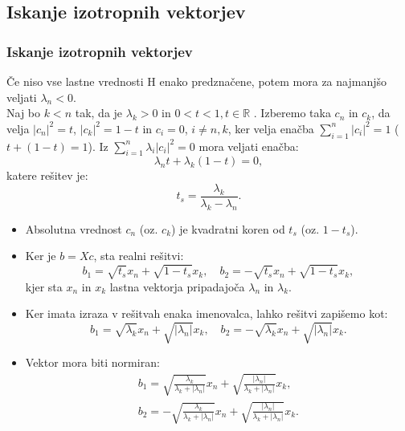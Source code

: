 \documentclass{beamer}
\newcommand{\abs}[1]{ \left\lvert#1\right\rvert}
\newcommand{\R}{\mathbb R}
\begin{document}
\subsection{Iskanje izotropnih vektorjev}
\begin{frame}
\frametitle{Iskanje izotropnih vektorjev}
\begin{block}{}
Če niso vse lastne vrednosti H enako predznačene, potem mora za najmanjšo veljati $\lambda_n <0$. \medskip \\
 Naj bo $k<n$ tak, da je $\lambda_k >0$ in $0<t<1, t\in \R$ . Izberemo \medskip taka $c_n$ in $c_k$, da velja  $\abs{c_n}^2 =t$, $\abs{c_k}^2=1-t$ in $c_i =0$, $i\not=n,k$, \medskip  ker velja enačba $\sum_{i=1}^{n}\abs{c_i}^2=1$ ($t+ (1-t)=1$). Iz \medskip $\sum_{i=1}^{n} \lambda_i \abs{c_i}^2=0$ mora veljati enačba: $$\lambda_n t +\lambda_k (1-t)=0,$$ katere rešitev je:
\begin{equation*}
t_s=\frac{\lambda_k}{\lambda_k -\lambda_n}.
\end{equation*}
\end{block}
\end{frame}
\begin{frame}
\begin{itemize}
\item Absolutna vrednost $c_n$ (oz. $c_k$) je kvadratni koren od $t_s$ (oz. $1-t_s$).
\item Ker je $b=Xc$, sta realni rešitvi: $$b_1=\sqrt{t_s}x_n +\sqrt{1-t_s}x_k,\quad b_2=-\sqrt{t_s}x_n+\sqrt{1-t_s}x_k,$$ kjer sta $x_n$ in $x_k$ lastna vektorja pripadajoča  $\lambda_n$ in $\lambda_k$.\pause
\item Ker imata izraza v rešitvah enaka imenovalca, lahko rešitvi zapišemo kot: $$b_1=\sqrt{\lambda_k}x_n+\sqrt{\abs{\lambda_n}}x_k, \quad b_2=-\sqrt{\lambda_k}x_n+\sqrt{\abs{\lambda_n}}x_k.$$ \pause
\item Vektor mora biti normiran:
\begin{align*}
b_1=\sqrt{\frac{\lambda_k}{\lambda_k +\abs{\lambda_n}}}x_n + \sqrt{\frac{\abs{\lambda_n}}{\lambda_k +\abs{\lambda_n}}}x_k,\\ b_2=-\sqrt{\frac{\lambda_k}{\lambda_k +\abs{\lambda_n}}}x_n + \sqrt{\frac{\abs{\lambda_n}}{\lambda_k +\abs{\lambda_n}}}x_k.
\end{align*}
\end{itemize}
\end{frame}
\end{document}
